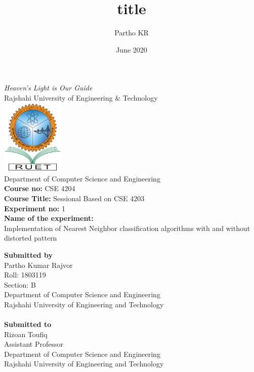 \documentclass[a4paper]{report}
\title{title}
\author{Partho KR}
\date{June 2020}
\begin{document}
    \begin{center}
        \textit{Heaven’s Light is Our Guide} \\
        \vspace{1cm}
        \Large{Rajshahi University of Engineering \& Technology} \\
        \vspace{1cm}
        \includegraphics[width=3cm]{ruet-logo.png}\\
        \vspace{0.1cm}
        \Large{Department of Computer Science and Engineering} \\
        \vspace{1cm}
        \large{\textbf{Course no:} CSE 4204} \\
        \large{\textbf{Course Title:} Sessional Based on CSE 4203} \\
        \large{\textbf{Experiment no:} 1}\\
        \large{\textbf{Name of the experiment:}} \\
        \large{Implementation of Nearest Neighbor classification algorithms with and without distorted pattern} \\
        \vspace{1cm}
        \thispagestyle{empty}
    \end{center}
    \Large{\textbf{Submitted by}}\\
    Partho Kumar Rajvor \\
    Roll: 1803119 \\
    Section: B \\
    Department of Computer Science and Engineering\\
    Rajshahi University of Engineering and Technology\\\\
    \Large{\textbf{Submitted to}}\\
    Rizoan Toufiq \\
    Assistant Professor \\
    Department of Computer Science and Engineering \\
    Rajshahi University of Engineering and Technology
    \tableofcontents{}
    \thispagestyle{empty}
    \setcounter{page}{2}
    
\end{document}
